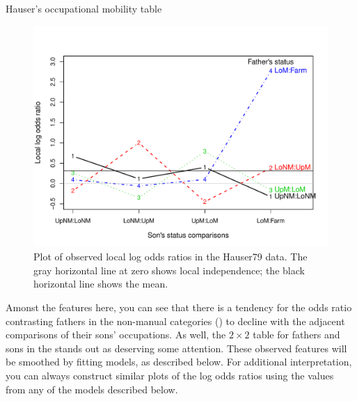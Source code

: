 \documentclass[11pt]{book}\usepackage[]{graphicx}\usepackage[]{color}
\newenvironment{knitrout}{}{} %
\renewenvironment{knitrout}{\small\renewcommand{\baselinestretch}{.85}}{} %
\begin{document}
\begin{Example}[hauser1]{Hauser's occupational mobility table}
\begin{knitrout}
\begin{figure}[!htbp]
\centerline{\includegraphics[width=.75\textwidth]{ch08/fig/hauser-lor-plot-1} }

\caption[Plot of observed local log odds ratios in the Hauser79 data]{Plot of observed local log odds ratios in the Hauser79 data. The gray horizontal line at zero shows local independence; the black horizontal line shows the mean.\label{fig:hauser-lor-plot}}
\end{figure}


\end{knitrout}
Amonst the features here, you can see that there is a tendency for the odds ratio
contrasting fathers in the non-manual categories () to decline
with the adjacent comparisons of their sons' occupations.  As well, the
$2 \times 2$ table for fathers and sons in the  stands out
as deserving some attention.  These observed features will be smoothed
by fitting models, as described below.  For additional interpretation, you
can always construct similar plots of the log odds ratios using the
 values from any of the models described below.


\end{Example}
\end{document}
